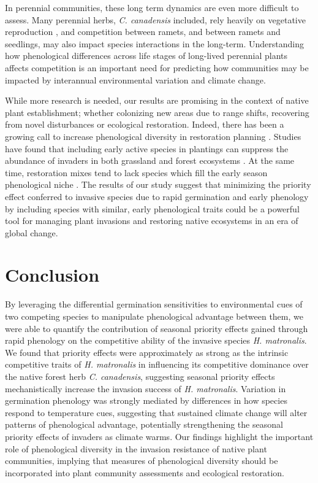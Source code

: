 \documentclass{article}[11pt]
\begin{document}
In perennial communities, these long term dynamics are even more difficult to assess. Many perennial herbs, \textit{C. canadensis} included, rely heavily on vegetative reproduction \citep{Hawkins:2005ve}, and competition between ramets, and between ramets and seedlings, may also impact species interactions in the long-term. Understanding how phenological differences across life stages of long-lived perennial plants affects competition is an important need for predicting how communities may be impacted by interannual environmental variation and climate change.  

While more research is needed, our results are promising in the context of native plant establishment; whether colonizing new areas due to range shifts, recovering from novel disturbances or ecological restoration. Indeed, there has been a growing call to increase phenological diversity in restoration planning \citep{Hess:2019vn}. Studies have found that including early active species in plantings can suppress the abundance of invaders in both grassland \citep{Cleland:2013wo} and forest ecosystems \citep{Schuster:2020ww}. At the same time, restoration mixes tend to lack species which fill the early season phenological niche \citep{Havens:2016vo}. The results of our study suggest that minimizing the priority effect conferred to invasive species due to rapid germination and early phenology by including species with similar, early phenological traits could be a powerful tool for managing plant invasions and restoring native ecosystems in an era of global change.

\section*{Conclusion}
By leveraging the differential germination sensitivities to environmental cues of two competing species to manipulate phenological advantage between them, we were able to quantify the contribution of seasonal priority effects gained through rapid phenology on the competitive ability of the invasive species \textit{H. matronalis}. We found that priority effects were approximately as strong as the intrinsic competitive traits of \textit{H. matronalis} in influencing its competitive dominance over the native forest herb \textit{C. canadensis}, suggesting seasonal priority effects mechanistically increase the invasion success of \textit{H. matronalis}. Variation in germination phenology was strongly mediated by differences in how species respond to temperature cues, suggesting that sustained climate change will alter patterns of phenological advantage, potentially strengthening the seasonal priority effects of invaders as climate warms. Our findings highlight the important role of phenological diversity in the invasion resistance of native plant communities, implying that measures of phenological diversity should be incorporated into plant community assessments and ecological restoration. 
\end{document}
